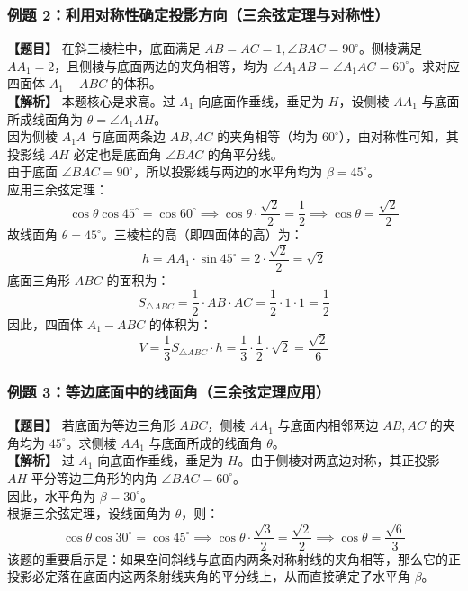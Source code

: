 \documentclass[11pt,a4paper]{ctexart}
\begin{document}
\subsubsection{例题 2：利用对称性确定投影方向（三余弦定理与对称性）}
\textbf{【题目】} 在斜三棱柱中，底面满足 $AB = AC = 1, \angle BAC = 90^\circ$。侧棱满足 $AA_1 = 2$，且侧棱与底面两边的夹角相等，均为 $\angle A_1AB = \angle A_1AC = 60^\circ$。求对应四面体 $A_1-ABC$ 的体积。\\
\textbf{【解析】} 本题核心是求高。过 $A_1$ 向底面作垂线，垂足为 $H$，设侧棱 $AA_1$ 与底面所成线面角为 $\theta = \angle A_1AH$。\\
因为侧棱 $A_1A$ 与底面两条边 $AB, AC$ 的夹角相等（均为 $60^\circ$），由对称性可知，其投影线 $AH$ 必定也是底面角 $\angle BAC$ 的角平分线。\\
由于底面 $\angle BAC = 90^\circ$，所以投影线与两边的水平角均为 $\beta = 45^\circ$。\\
应用三余弦定理：
\[ \cos\theta \cos 45^\circ = \cos 60^\circ \implies \cos\theta \cdot \frac{\sqrt{2}}{2} = \frac{1}{2} \implies \cos\theta = \frac{\sqrt{2}}{2} \]
故线面角 $\theta = 45^\circ$。三棱柱的高（即四面体的高）为：
\[ h = AA_1 \cdot \sin 45^\circ = 2 \cdot \frac{\sqrt{2}}{2} = \sqrt{2} \]
底面三角形 $ABC$ 的面积为：
\[ S_{\triangle ABC} = \frac{1}{2} \cdot AB \cdot AC = \frac{1}{2} \cdot 1 \cdot 1 = \frac{1}{2} \]
因此，四面体 $A_1-ABC$ 的体积为：
\[ V = \frac{1}{3} S_{\triangle ABC} \cdot h = \frac{1}{3} \cdot \frac{1}{2} \cdot \sqrt{2} = \frac{\sqrt{2}}{6} \]

\subsubsection{例题 3：等边底面中的线面角（三余弦定理应用）}
\textbf{【题目】} 若底面为等边三角形 $ABC$，侧棱 $AA_1$ 与底面内相邻两边 $AB, AC$ 的夹角均为 $45^\circ$。求侧棱 $AA_1$ 与底面所成的线面角 $\theta$。\\
\textbf{【解析】} 过 $A_1$ 向底面作垂线，垂足为 $H$。由于侧棱对两底边对称，其正投影 $AH$ 平分等边三角形的内角 $\angle BAC = 60^\circ$。\\
因此，水平角为 $\beta = 30^\circ$。\\
根据三余弦定理，设线面角为 $\theta$，则：
\[ \cos\theta \cos 30^\circ = \cos 45^\circ \implies \cos\theta \cdot \frac{\sqrt{3}}{2} = \frac{\sqrt{2}}{2} \implies \cos\theta = \frac{\sqrt{6}}{3} \]
该题的重要启示是：如果空间斜线与底面内两条对称射线的夹角相等，那么它的正投影必定落在底面内这两条射线夹角的平分线上，从而直接确定了水平角 $\beta$。
\end{document}
